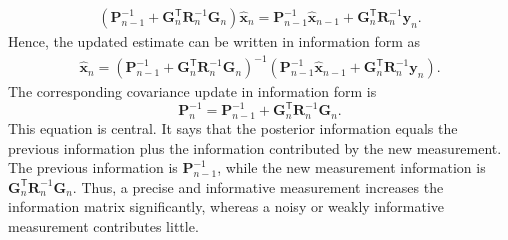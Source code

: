 \documentclass[11pt,oneside,openany]{book}
\begin{document}
\begin{align*}
\left(\mathbf{P}_{n-1}^{-1}+\mathbf{G}_n^{\mathsf T}\mathbf{R}_n^{-1}\mathbf{G}_n\right)\widehat{\mathbf{x}}_n=
\mathbf{P}_{n-1}^{-1}\widehat{\mathbf{x}}_{n-1}
+\mathbf{G}_n^{\mathsf T}\mathbf{R}_n^{-1}\mathbf{y}_n.
\end{align*}
Hence, the updated estimate can be written in information form as
\begin{equation}
\begin{aligned}
\widehat{\mathbf{x}}_n
=
\left(
\mathbf{P}_{n-1}^{-1}
+
\mathbf{G}_n^{\mathsf T}
\mathbf{R}_n^{-1}
\mathbf{G}_n
\right)^{-1}
\left(
\mathbf{P}_{n-1}^{-1}
\widehat{\mathbf{x}}_{n-1}
+
\mathbf{G}_n^{\mathsf T}
\mathbf{R}_n^{-1}
\mathbf{y}_n
\right).
\end{aligned}
\end{equation}
The corresponding covariance update in information form is
\begin{equation}
\mathbf{P}_n^{-1}
=
\mathbf{P}_{n-1}^{-1}
+
\mathbf{G}_n^{\mathsf T}
\mathbf{R}_n^{-1}
\mathbf{G}_n.
\end{equation}
This equation is central. It says that the posterior information equals the previous information plus the information contributed by the new measurement. The previous information is $\mathbf{P}_{n-1}^{-1}$, while the new measurement information is $\mathbf{G}_n^{\mathsf T}\mathbf{R}_n^{-1}\mathbf{G}_n$. Thus, a precise and informative measurement increases the information matrix significantly, whereas a noisy or weakly informative measurement contributes little.
\end{document}
